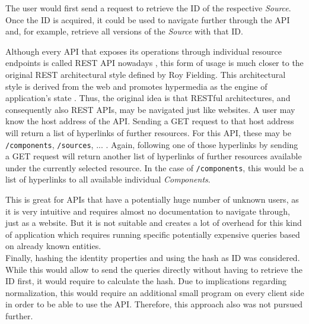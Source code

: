 The user would first send a request to retrieve the ID of the respective \emph{Source}. Once the ID is acquired, it could be used to navigate further through the API and, for example, retrieve all versions of the \emph{Source} with that ID.\par
Although every API that exposes its operations through individual resource endpoints is called REST API nowadays \cite{RichardsonMaturityModel}, this form of usage is much closer to the original REST architectural style defined by Roy Fielding. This architectural style is derived from the web and promotes hypermedia as the engine of application's state \cite{RESTArchitecturalStyle}. Thus, the original idea is that RESTful architectures, and consequently also REST APIs, may be navigated just like websites. A user may know the host address of the API. Sending a GET request to that host address will return a list of hyperlinks of further resources. For this API, these may be \lstinline|/components|, \lstinline|/sources|, ... . Again, following one of those hyperlinks by sending a GET request will return another list of hyperlinks of further resources available under the currently selected resource. In the case of \lstinline|/components|, this would be a list of hyperlinks to all available individual \emph{Components}.\par
This is great for APIs that have a potentially huge number of unknown users, as it is very intuitive and requires almost no documentation to navigate through, just as a website. But it is not suitable and creates a lot of overhead for this kind of application which requires running specific potentially expensive queries based on already known entities.\\

Finally, hashing the identity properties and using the hash as ID was considered. While this would allow to send the queries directly without having to retrieve the ID first, it would require to calculate the hash. Due to implications regarding normalization, this would require an additional small program on every client side in order to be able to use the API. Therefore, this approach also was not pursued further.

